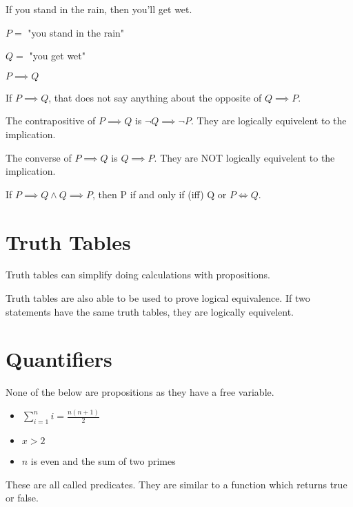 \begin{example}
  If you stand in the rain, then you'll get wet.

  $P=$ "you stand in the rain"

  $Q=$ "you get wet"

  $P \implies Q$
\end{example}

\begin{note}
  If $P \implies Q$, that does not say anything about the opposite of $Q \implies P$.
\end{note}

\begin{definition}[Contrapositive]
The contrapositive of $P \implies Q$ is $\lnot Q \implies \lnot P$.
They are logically equivelent to the implication.
\end{definition}

\begin{definition}[Converse]
The converse of $P \implies Q$ is $Q \implies P$.
They are NOT logically equivelent to the implication.
\end{definition}

\begin{definition}
  If $P\implies Q \land Q \implies P$, then P if and only if (iff) Q or $P \iff Q$.
\end{definition}

\section{Truth Tables}
Truth tables can simplify doing calculations with propositions.

Truth tables are also able to be used to prove logical equivalence.
If two statements have the same truth tables, they are logically equivelent.

\section{Quantifiers}
None of the below are propositions as they have a free variable.
\begin{itemize}
  \item $\sum_{i=1}^{n} i = \frac{n(n+1)}{2}$
  \item $x > 2$
  \item $n$ is even and the sum of two primes
\end{itemize}
These are all called predicates.
They are similar to a function which returns true or false.

